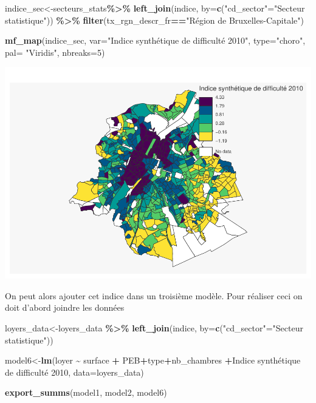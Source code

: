 \documentclass[
]{book}
\newenvironment{Shaded}{\begin{snugshade}}{\end{snugshade}}
\newcommand{\AttributeTok}[1]{\textcolor[rgb]{0.13,0.29,0.53}{#1}}
\newcommand{\DecValTok}[1]{\textcolor[rgb]{0.00,0.00,0.81}{#1}}
\newcommand{\FunctionTok}[1]{\textcolor[rgb]{0.13,0.29,0.53}{\textbf{#1}}}
\newcommand{\NormalTok}[1]{#1}
\newcommand{\OtherTok}[1]{\textcolor[rgb]{0.56,0.35,0.01}{#1}}
\newcommand{\SpecialCharTok}[1]{\textcolor[rgb]{0.81,0.36,0.00}{\textbf{#1}}}
\newcommand{\StringTok}[1]{\textcolor[rgb]{0.31,0.60,0.02}{#1}}
\begin{document}
\begin{Shaded}
\begin{Highlighting}[]
\NormalTok{indice\_sec}\OtherTok{\textless{}{-}}\NormalTok{secteurs\_stats}\SpecialCharTok{\%\textgreater{}\%}
  \FunctionTok{left\_join}\NormalTok{(indice, }\AttributeTok{by=}\FunctionTok{c}\NormalTok{(}\StringTok{"cd\_sector"}\OtherTok{=}\StringTok{"Secteur statistique"}\NormalTok{)) }\SpecialCharTok{\%\textgreater{}\%}
  \FunctionTok{filter}\NormalTok{(tx\_rgn\_descr\_fr}\SpecialCharTok{==}\StringTok{"Région de Bruxelles{-}Capitale"}\NormalTok{)}

\FunctionTok{mf\_map}\NormalTok{(indice\_sec,}
       \AttributeTok{var=}\StringTok{"Indice synthétique de difficulté 2010"}\NormalTok{,}
       \AttributeTok{type=}\StringTok{"choro"}\NormalTok{,}
       \AttributeTok{pal=} \StringTok{"Viridis"}\NormalTok{,}
       \AttributeTok{nbreaks=}\DecValTok{5}\NormalTok{)}
\end{Highlighting}
\end{Shaded}

\includegraphics{manuel_geo_quanti_files/figure-latex/unnamed-chunk-29-1.pdf}

On peut alors ajouter cet indice dans un troisième modèle. Pour réaliser
ceci on doit d'abord joindre les données

\begin{Shaded}
\begin{Highlighting}[]
\NormalTok{loyers\_data}\OtherTok{\textless{}{-}}\NormalTok{loyers\_data }\SpecialCharTok{\%\textgreater{}\%}
  \FunctionTok{left\_join}\NormalTok{(indice, }\AttributeTok{by=}\FunctionTok{c}\NormalTok{(}\StringTok{"cd\_sector"}\OtherTok{=}\StringTok{"Secteur statistique"}\NormalTok{))}

\NormalTok{model6}\OtherTok{\textless{}{-}}\FunctionTok{lm}\NormalTok{(loyer }\SpecialCharTok{\textasciitilde{}}\NormalTok{ surface }\SpecialCharTok{+}\NormalTok{ PEB}\SpecialCharTok{+}\NormalTok{type}\SpecialCharTok{+}\NormalTok{nb\_chambres }\SpecialCharTok{+}\StringTok{\textasciigrave{}}\AttributeTok{Indice synthétique de difficulté 2010}\StringTok{\textasciigrave{}}\NormalTok{, }\AttributeTok{data=}\NormalTok{loyers\_data)}

\FunctionTok{export\_summs}\NormalTok{(model1, model2, model6)}
\end{Highlighting}
\end{Shaded}
\end{document}
